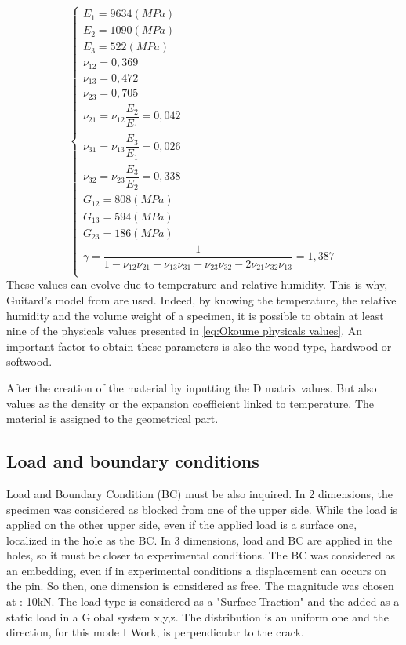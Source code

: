 \begin{equation}
	\left\{
	\begin{array}{llllllllllll}
		E_{1} = 9634 (MPa) \\
		E_{2} = 1090 (MPa)\\
		E_{3} = 522 (MPa) \\
		\nu_{12} = 0,369 \\
		\nu_{13} = 0,472 \\
		\nu_{23} = 0,705 \\
		\nu_{21} = \nu_{12}\dfrac{E_{2}}{E_{1}} = 0,042 \\
		\nu_{31} = \nu_{13}\dfrac{E_{3}}{E_{1}} = 0,026 \\
		\nu_{32} = \nu_{23}\dfrac{E_{3}}{E_{2}} = 0,338 \\
		G_{12} = 808 (MPa) \\
		G_{13} = 594 (MPa) \\
		G_{23} = 186 (MPa) \\
		\gamma = \dfrac{1}{1-\nu_{12}\nu_{21}-\nu_{13}\nu_{31}-\nu_{23}\nu_{32}-2\nu_{21}\nu_{32}\nu_{13}} = 1,387 \\
	\end{array}
	\right.
	\label{eq:Okoume physicals values}
\end{equation}
These values can evolve due to temperature and relative humidity. This is why, Guitard's model from \parencite{Reference2} are used. Indeed, by knowing the temperature, the relative humidity and the volume weight of a specimen, it is possible to obtain at least nine of the physicals values presented in \ref{eq:Okoume physicals values}. An important factor to obtain these parameters is also the wood type, hardwood or softwood. 

After the creation of the material by inputting the D matrix values. But also values as the density or the expansion coefficient linked to temperature. The material is assigned to the geometrical part.


\subsection{Load and boundary conditions}
Load and Boundary Condition (BC) must be also inquired. In 2 dimensions, the specimen was considered as blocked from one of the upper side. While the load is applied on the other upper side, even if the applied load is a surface one, localized in the hole as the BC. In 3 dimensions, load and BC are applied in the holes, so it must be closer to experimental conditions. The BC was considered as an embedding, even if in experimental conditions a displacement can occurs on the pin. So then, one dimension is considered as free. The magnitude was chosen at : 10\si{\kilo\newton}. The load type is considered as a "Surface Traction" and the added as a static load in a Global system x,y,z. The distribution is an uniform one and the direction, for this mode I Work, is perpendicular to the crack.

